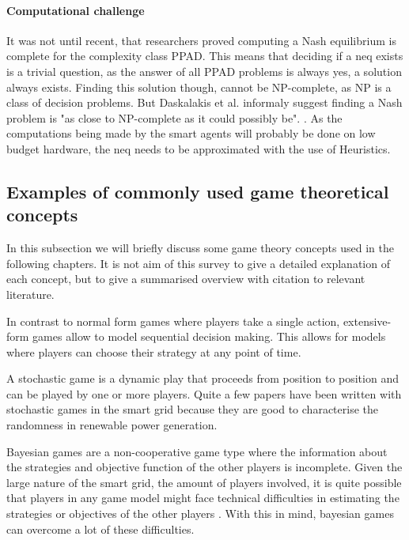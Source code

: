 \paragraph{Computational challenge} 
It was not until recent, that researchers proved computing a Nash equilibrium is complete for the complexity class PPAD\cite{daskalakis2009complexity}. This means that deciding if a \ac{neq} exists is a trivial question, as the answer of all PPAD problems is always yes, a solution always exists. Finding this solution though, cannot be NP-complete, as NP is a class of decision problems. But Daskalakis et al. informaly suggest finding a Nash problem is "as close to NP-complete as it could possibly be". \cite{daskalakis2009complexity, Aaronson2012}. 
As the computations being made by the smart agents will probably be done on low budget hardware, the \ac{neq} needs to be  approximated with the use of Heuristics. \cite{MicrogridModellingPetrosAristidou,AumannGameTheoryAccomplish} 

\subsection{Examples of commonly used game theoretical concepts}
In this subsection we will briefly discuss some game theory concepts used in the following chapters. It is not aim of this survey to give a detailed explanation of each concept, but to give a summarised overview with citation to relevant literature.

In contrast to normal form games where players take a single action, extensive-form games allow to model sequential decision making. This allows for models where players can choose their strategy at any point of time.

A stochastic game is a dynamic play that proceeds from position to position \cite{Shapley1953} and can be played by one or more players. Quite a few papers have been written with stochastic games in the smart grid \cite{LiangZhuang2014} because they are good to characterise the randomness in renewable power generation.  

Bayesian games are a non-cooperative game type where the information about the strategies and objective function of the other players is incomplete. Given the large nature of the smart grid, the amount of players involved, it is quite possible that players in any game model might face technical difficulties in estimating the strategies or objectives of the other players \cite{keypaper}. With this in mind, bayesian games can overcome a lot of these difficulties.

